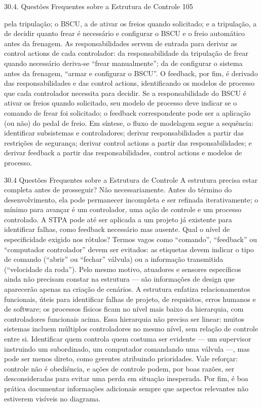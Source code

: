 30.4. Questões Frequentes sobre a Estrutura de Controle 105

pela tripulação; o BSCU, a de ativar os freios quando solicitado; e a tripulação, a de decidir quanto frear é necessário e configurar o BSCU e o freio automático antes da frenagem. As responsabilidades servem de entrada para derivar as control actions de cada controlador: da responsabilidade da tripulação de frear quando necessário deriva-se “frear manualmente”; da de configurar o sistema antes da frenagem, “armar e configurar o BSCU”. O feedback, por fim, é derivado das responsabilidades e das control actions, identificando os modelos de processo que cada controlador necessita para decidir. Se a responsabilidade do BSCU é ativar os freios quando solicitado, seu modelo de processo deve indicar se o comando de frear foi solicitado; o feedback correspondente pode ser a aplicação (ou não) do pedal de freio. Em síntese, o fluxo de modelagem segue a sequência: identificar subsistemas e controladores; derivar responsabilidades a partir das restrições de segurança; derivar control actions a partir das responsabilidades; e derivar feedback a partir das responsabilidades, control actions e modelos de processo.

30.4 Questões Frequentes sobre a Estrutura de Controle A estrutura precisa estar completa antes de prosseguir? Não necessariamente. Antes do término do desenvolvimento, ela pode permanecer incompleta e ser refinada iterativamente; o mínimo para avançar é um controlador, uma ação de controle e um processo controlado. A STPA pode até ser aplicada a um projeto já existente para identificar falhas, como feedback necessário mas ausente. Qual o nível de especificidade exigido nos rótulos? Termos vagos como “comando”, “feedback” ou “computador controlador” devem ser evitados: as etiquetas devem indicar o tipo de comando (“abrir” ou “fechar” válvula) ou a informação transmitida (“velocidade da roda”). Pelo mesmo motivo, atuadores e sensores específicos ainda não precisam constar na estrutura — são informações de design que aparecerão apenas na criação de cenários. A estrutura enfatiza relacionamentos funcionais, úteis para identificar falhas de projeto, de requisitos, erros humanos e de software; os processos físicos ficam no nível mais baixo da hierarquia, com controladores funcionais acima. Essa hierarquia não precisa ser linear: muitos sistemas incluem múltiplos controladores no mesmo nível, sem relação de controle entre si. Identificar quem controla quem costuma ser evidente — um supervisor instruindo um subordinado, um computador comandando uma válvula —, mas pode ser menos direto, como gerentes atribuindo prioridades. Vale reforçar: controle não é obediência, e ações de controle podem, por boas razões, ser desconsideradas para evitar uma perda em situação inesperada. Por fim, é boa prática documentar informações adicionais sempre que aspectos relevantes não estiverem visíveis no diagrama.

